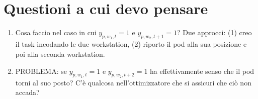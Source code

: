 \section{Questioni a cui devo pensare}
\begin{enumerate}
    \item Cosa faccio nel caso in cui $y_{p,w_1,t} = 1$ e $y_{p,w_2,t+1} = 1$? Due approcci: (1) creo il task incodando le due workstation, (2) riporto il pod alla sua posizione e poi alla seconda workstation.
    \item PROBLEMA: se $y_{p,w_1,t} = 1$ e $y_{p,w_2,t+2} = 1$ ha effettivamente senso che il pod torni al suo posto? C'è qualcosa nell'ottimizzatore che si assicuri che ciò non accada?
\end{enumerate}

